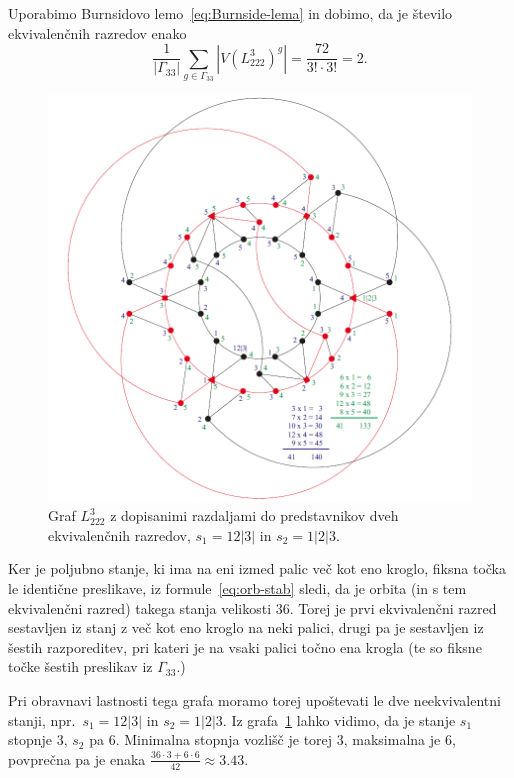 \documentclass[12pt,a4paper]{amsart}
\theoremstyle{definition} %
\theoremstyle{plain} %
\begin{document}
    Uporabimo Burnsidovo lemo~\eqref{eq:Burnside-lema} in dobimo, da je število ekvivalenčnih razredov enako
    \[\frac{1}{|\Gamma_{33}|} \sum_{g \in \Gamma_{33}} |V(L^3_{222})^g| = \frac{72}{3! \cdot 3!} = 2. \]
    
    \begin{figure}[h]
        \includegraphics[width=400pt]{img/graph-L^3_222.png}
        \caption{Graf $L^3_{222}$ z dopisanimi razdaljami do predstavnikov dveh ekvivalenčnih razredov, $s_1=12|3|$ in $s_2 = 1|2|3$.}
        \label{fig:L^3_222}
    \end{figure}
    
    Ker je poljubno stanje, ki ima na eni izmed palic več kot eno kroglo, fiksna točka le identične preslikave, iz formule~\eqref{eq:orb-stab} sledi, da je orbita (in s tem ekvivalenčni razred) takega stanja velikosti $36$. Torej je prvi ekvivalenčni razred sestavljen iz stanj z več kot eno kroglo na neki palici, drugi pa je sestavljen iz šestih razporeditev, pri kateri je na vsaki palici točno ena krogla (te so fiksne točke šestih preslikav iz $\Gamma_{33}$.)
    
    Pri obravnavi lastnosti tega grafa moramo torej upoštevati le dve neekvivalentni stanji, npr.\ $s_1=12|3|$ in $s_2 = 1|2|3$. Iz grafa~\ref{fig:L^3_222} lahko vidimo, da je stanje $s_1$ stopnje $3$, $s_2$ pa $6$. Minimalna stopnja vozlišč je torej $3$, maksimalna je $6$, povprečna pa je enaka $\frac{36 \cdot 3 + 6 \cdot 6}{42} \approx 3.43$.
    
\end{document}
